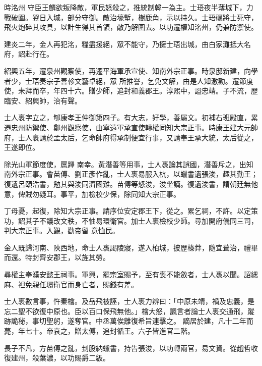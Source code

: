 \begin{pinyinscope}
 時洺州
 守臣王麟欲叛降敵，軍民怒殺之，推統制韓一為主。士珸夜半薄城下，力戰破圍。翌日入城，部分守御。敵治壕塹，樹鹿角，示以持久。士珸礪將士死守，飛火炮碎其攻具，以計生得其首領，敵乃解圍去。以功遷權知洺州，仍兼防禦使。



 建炎二年，金人再犯洺，糧盡援絕，眾不能守，乃擁士珸出城，由白家灘抵大名府，詔赴行在。



 紹興五年，遷泉州觀察使，再遷平海軍承宣使、知南外宗正事。時泉邸新建，向學者少，士珸奏宗子善軫文藝卓絕，眾
 所推譽，乞免文解，由是人知激勸。遷節度使，未拜而卒，年四十六。贈少師，追封和義郡王。淳熙中，謚忠靖。子不流，歷臨安、紹興帥，治有聲。



 士人褭字立之，郇康孝王仲御第四子。有大志，好學，善屬文。初補右班殿直，累遷忠州防禦使、鄭州觀察使，由寧遠軍承宣使轉權同知大宗正事。時康王建大元帥府，士人褭請於孟太后，乞命帥府得承制便宜行事，又請奉王承大統，太后從之，王遂即位。



 除光山軍節度使，扈蹕
 南幸。黃潛善等用事，士人褭論其誤國，潛善斥之，出知南外宗正事。會苗傅、劉正彥作亂，士人褭易服入杭，以蠟書遺張浚，趣其勤王；復遺呂頤浩書，勉其與浚同濟國難。苗傅等怒浚，浚坐謫。復遺浚書，謂朝廷無他意，俾賊勿疑耳。事平，加檢校少保，除同知大宗正事。



 丁母憂，起復，除知大宗正事。請序位安定郡王下，從之。累乞祠，不許。以定策功，詔其子不議改文秩，不怞易環衛官。加士人褭檢校少師。尋加開府儀同三司，判大宗正事。入覲，勸帝留
 意恤民。



 金人既歸河南、陜西地，命士人褭謁陵寢，遂入柏城，披歷榛莽，隨宜葺治，禮畢而還。特封齊安郡王，以旌其勞。



 尋權主奉濮安懿王祠事。軍興，罷宗室賜予，至有喪不能斂者，士人褭以聞。詔緦麻、袒免親任環衛官而身亡者，賜錢有差。



 士人褭數言事，忤秦檜。及岳飛被誣，士人褭力辨曰：「中原未靖，禍及忠義，是忘二聖不欲復中原也。臣以百口保飛無他。」檜大怒，諷言者論士人褭交通飛，蹤跡詭秘，事切聖躬，遂奪官。中丞萬俟離復希旨連擊之。
 謫居於建，凡十二年而薨，年七十。帝哀之，贈太傅，追封循王。六子皆進官二階。



 長子不凡，方苗傅之亂，刲股納蠟書，持告張浚，以功轉兩官，易文資。從趙哲收復建州，殺葉濃，以功賜爵二級。




\end{pinyinscope}
